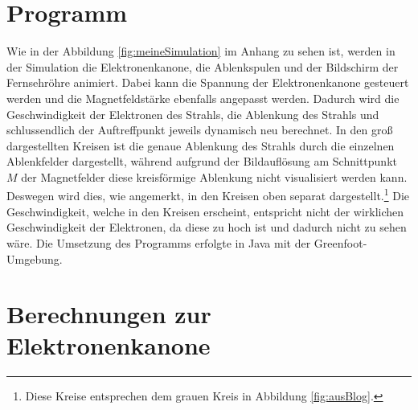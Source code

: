 \section{Programm}
Wie in der Abbildung \ref{fig:meineSimulation} im Anhang zu sehen ist, werden in der Simulation die Elektronenkanone, die Ablenkspulen und der Bildschirm der Fernsehröhre animiert. 
Dabei kann die Spannung der Elektronenkanone gesteuert werden und die Magnetfeldstärke ebenfalls angepasst werden.
Dadurch wird die Geschwindigkeit der Elektronen des Strahls, die Ablenkung des Strahls und schlussendlich der Auftreffpunkt jeweils dynamisch neu berechnet.
In den groß dargestellten Kreisen ist die genaue Ablenkung des Strahls durch die einzelnen Ablenkfelder dargestellt, während aufgrund der Bildauflösung am Schnittpunkt $M$ der Magnetfelder diese kreisförmige Ablenkung nicht visualisiert werden kann.   
Deswegen wird dies, wie angemerkt, in den Kreisen oben separat dargestellt.\footnote{Diese Kreise entsprechen dem grauen Kreis in Abbildung \ref{fig:ausBlog}.}
Die Geschwindigkeit, welche in den Kreisen erscheint, entspricht nicht der wirklichen Geschwindigkeit der Elektronen, da diese zu hoch ist und dadurch nicht zu sehen wäre.
Die Umsetzung des Programms erfolgte in Java mit der Greenfoot-Umgebung.
\label{sec:animation}

\section{Berechnungen zur Elektronenkanone}

\label{sec:tolle-section}
 
